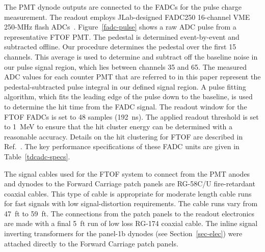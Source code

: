 \documentclass[3p,times,twocolumn]{elsarticle}
\begin{document}
The PMT dynode outputs are connected to the FADCs for the pulse charge measurement. The readout
employs JLab-designed FADC250 16-channel VME 250-MHz flash ADCs~\cite{fadc-manual}. 
Figure~\ref{fadc-pulse} shows a raw ADC pulse from a representative FTOF PMT. The pedestal is determined
event-by-event and subtracted offline. Our procedure determines the pedestal over the first 15 channels. This
average is used to determine and subtract off the baseline noise in our pulse signal region, which lies between
channels 35 and 65. The measured ADC values for each counter PMT that are referred to in this paper represent
the pedestal-subtracted pulse integral in our defined signal region. A pulse fitting algorithm, which fits the leading
edge of the pulse down to the baseline, is used to determine the hit time from the FADC signal. The readout window
for the FTOF FADCs is set to 48 samples (192~ns). The applied readout threshold is set to 1~MeV to ensure that
the hit cluster energy can be determined with a reasonable accuracy. Details on the hit clustering for FTOF are
described in Ref.~\cite{recon-nim}. The key performance specifications of these FADC units are given in
Table~\ref{tdcadc-specs}.

The signal cables used for the FTOF system to connect from the PMT anodes and dynodes to the Forward
Carriage patch panels are RG-58C/U fire-retardant coaxial cables. This type of cable is appropriate for
moderate length cable runs for fast signals with low signal-distortion requirements. The cable runs vary
from 47~ft to 59~ft. The connections from the patch panels to the readout electronics are made with a
final 5~ft run of low loss RG-174 coaxial cable. The inline signal inverting transformers for the panel-1b
dynodes (see Section~\ref{sec-elec}) were attached directly to the Forward Carriage patch panels.
\end{document}
